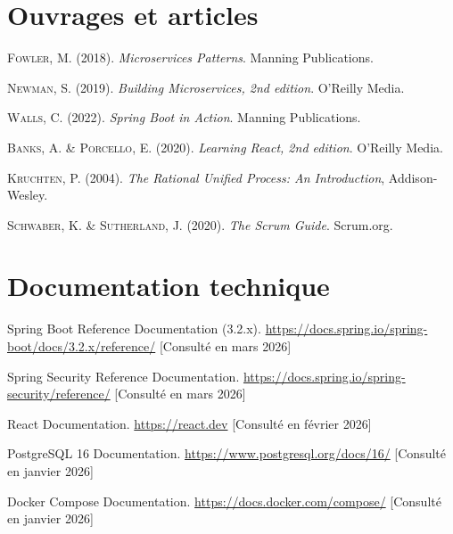 
\section*{Ouvrages et articles}

\begin{enumerate}[label={[\arabic*]}]
  \item \textsc{Fowler}, M. (2018). \textit{Microservices Patterns}. Manning Publications.
  \item \textsc{Newman}, S. (2019). \textit{Building Microservices, 2nd edition}. O'Reilly Media.
  \item \textsc{Walls}, C. (2022). \textit{Spring Boot in Action}. Manning Publications.
  \item \textsc{Banks}, A. \& \textsc{Porcello}, E. (2020).
    \textit{Learning React, 2nd edition}. O'Reilly Media.
  \item \textsc{Kruchten}, P. (2004). \textit{The Rational Unified Process: An Introduction},
    Addison-Wesley.
  \item \textsc{Schwaber}, K. \& \textsc{Sutherland}, J. (2020).
    \textit{The Scrum Guide}. Scrum.org.
\end{enumerate}

\section*{Documentation technique}

\begin{enumerate}[label={[\arabic*]}, resume]
  \item Spring Boot Reference Documentation (3.2.x).
    \url{https://docs.spring.io/spring-boot/docs/3.2.x/reference/}
    [Consulté en mars 2026]
  \item Spring Security Reference Documentation.
    \url{https://docs.spring.io/spring-security/reference/}
    [Consulté en mars 2026]
  \item React Documentation.
    \url{https://react.dev}
    [Consulté en février 2026]
  \item PostgreSQL 16 Documentation.
    \url{https://www.postgresql.org/docs/16/}
    [Consulté en janvier 2026]
  \item Docker Compose Documentation.
    \url{https://docs.docker.com/compose/}
    [Consulté en janvier 2026]
\end{enumerate}

